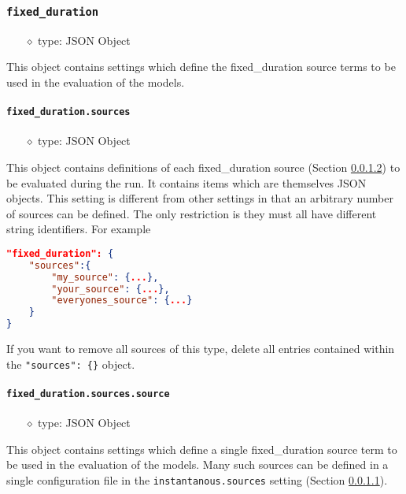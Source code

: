 \documentclass[]{article}
\def\code#1{\texttt{#1}}
\begin{document}
\subsubsection{\code{fixed\_duration}}
\begin{itemize}
    \item[$\diamond$] type: JSON Object 
\end{itemize}
This object contains settings which define the fixed\_duration source terms to be
used in the evaluation of the models.

\paragraph{\code{fixed\_duration.sources}}\label{sec:fixsources}
\begin{itemize}
    \item[$\diamond$] type: JSON Object 
\end{itemize}
This object contains definitions of each fixed\_duration source (Section
\ref{sec:fixsource}) to be evaluated during the run. It contains items which
are themselves JSON objects. This setting is different from other settings in
that an arbitrary number of sources can be defined. The only restriction is they
must all have different string identifiers. For example\\
\begin{lstlisting}[language=json,firstnumber=1]
"fixed_duration": {
    "sources":{
        "my_source": {...},
        "your_source": {...},
        "everyones_source": {...}
    }
}
\end{lstlisting}
\medskip

\noindent If you want to remove all sources of this type, delete all entries
contained within the \code{"sources": \{\}} object.

\paragraph{\code{fixed\_duration.sources.source}}\label{sec:fixsource}
\begin{itemize}
    \item[$\diamond$] type: JSON Object 
\end{itemize}
This object contains settings which define a single fixed\_duration source term to
be used in the evaluation of the models. Many such sources can be defined in a
single configuration file in the \code{instantanous.sources} setting (Section
\ref{sec:fixsources}).
\end{document}
